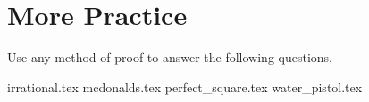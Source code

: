 \documentclass{exam}
\begin{document}
\section{More Practice}
Use any method of proof to answer the following questions.
\begin{questions}
{irrational.tex}
{mcdonalds.tex}
{perfect_square.tex}
{water_pistol.tex}
\end{questions}
\end{document}
